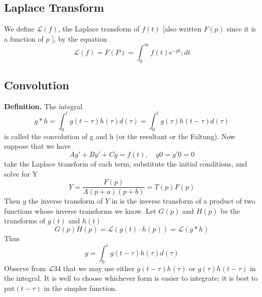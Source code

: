 \documentclass[../main.tex]{subfiles}
\begin{document}
\subsection*{Laplace Transform}
We define $\mathcal{L}(f )$, the Laplace transform of $f (t)$ [also written $F (p)$ since it is a function of $p$ ], by the equation
\begin{equation*}
    \mathcal{L}(f)=F(P)=\int_{0}^{\infty}f(t)e^{-pt};dt
\end{equation*}

\subsection*{Convolution}
\textbf{Definition.} The integral
\begin{equation*}
    g*h=\int_{0}^{t}g(t-\tau)h(\tau)d(\tau)=\int_{0}^{t}g(\tau)h(t-\tau)d(\tau)
\end{equation*}
is called the convolution of g and h (or the resultant or the Faltung). Now suppose that we have
\begin{equation*}
    Ay' + By' + Cy = f (t), \quad y0 = y'0 = 0
\end{equation*}
take the Laplace transform of each term, substitute the initial conditions, and solve for Y
\begin{equation*}
    Y=\frac{F(p)}{A(p + a)(p + b)}=T(p)F(p)
\end{equation*}
Then $y$ the inverse transform of $Y$ in is the inverse transform of a product of two functions whose inverse transforms we know. Let $G(p)$ and $H(p)$ be the transforms of $g(t)$ and $h(t)$
\begin{equation*}
    G(p)H(p)=\mathcal{L}(g(t)\cdot h(p))=\mathcal{L}(g*h)
\end{equation*} 
Thus
\begin{equation*}
    y=\int_{0}^{t}g(t-\tau)h(\tau)d(\tau)
\end{equation*}
Observe from $\mathcal{L}34$ that we may use either $g(t - \tau )h(\tau )$ or $g(\tau )h(t - \tau )$ in the integral. It is well to choose whichever form is easier to integrate; it is best to put$ (t - \tau )$ in the simpler function.
\end{document}
